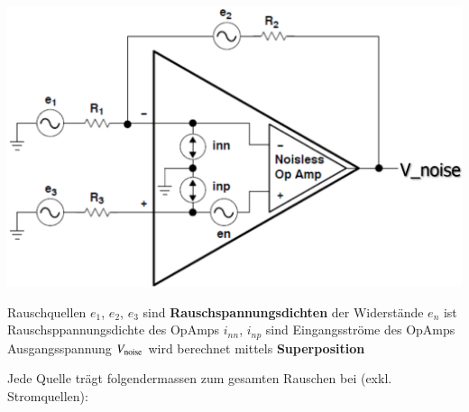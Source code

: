 \begin{minipage}[c]{0.4\columnwidth}
    \includegraphics[width=\columnwidth]{images/rauschen_opamp.png}
\end{minipage}
\hfill
\begin{minipage}[c]{0.58\columnwidth}
    \begin{outline}
         Rauschquellen 
            \2 $e_1$, $e_2$, $e_3$ sind \textbf{Rauschspannungsdichten} der Widerstände
            \2 $e_n$ ist Rauschsppannungsdichte des OpAmps
            \2 $i_{nn}$, $i_{np}$ sind Eingangsströme des OpAmps
        \1 Ausgangsspannung $V_{\rm noise}$ wird berechnet mittels \textbf{Superposition}
    \end{outline}
\end{minipage}


Jede Quelle trägt folgendermassen zum gesamten Rauschen bei (exkl. Stromquellen):

